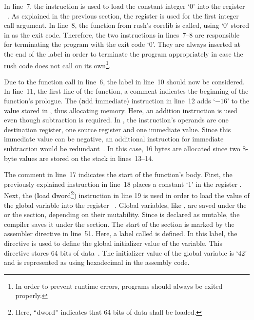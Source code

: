 In line~7, the  instruction is used to load the constant integer `0' into the register ~\cite[Reference Card]{Patterson2017}.
As explained in the previous section, the register  is used for the first integer call argument.
In line~8, the  function from rush's corelib is called, using `0' stored in  as the exit code.
Therefore, the two instructions in lines~7--8 are responsible for terminating the program with the exit code `0'.
They are always inserted at the end of the  label in order to terminate the program appropriately in case the rush code does not call  on its own\footnote{In order to prevent runtime errors, programs should always be exited properly.}.

Due to the function call in line~6, the  label in line~10 should now be considered.
In line~11, the first line of the  function, a comment indicates the beginning of the function's prologue.
The  (\textbf{a}dd \textbf{i}mmediate) instruction in line~12 adds `$-16$' to the value stored in , thus allocating memory.
Here, an addition instruction is used even though subtraction is required.
In \riscv{}, the  instruction's operands are one destination register, one source register and one immediate value.
Since this immediate value can be negative, an additional instruction for immediate subtraction would be redundant~\cite[Reference Card]{Patterson2017}.
In this case, 16 bytes are allocated since two 8-byte values are stored on the stack in lines~13--14.


The comment in line~17 indicates the start of the function's body.
First, the previously explained  instruction in line~18 places a constant `1' in the register .
Next, the  (\textbf{l}oad \textbf{d}word\footnote{Here, \enquote{dword} indicates that 64 bits of data shall be loaded.}) instruction in line 19 is used in order to load the value of the global variable  into the register ~\cite[Reference Card]{Patterson2017}.
Global variables, like , are saved under the  or the  section, depending on their mutability.
Since  is declared as mutable, the compiler saves it under the  section.
The start of the  section is marked by the  assembler directive in line~51.
Here, a label called  is defined.
In this label, the  directive is used to define the global initializer value of the variable.
This directive stores 64 bits of data~\cite[p.~39]{Patterson2017}.
The initializer value of the global variable is `42' and is represented as  using hexadecimal in the assembly code.

